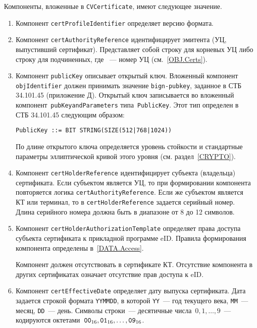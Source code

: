 Компоненты, вложенные в \verb|CVCertificate|, имеют следующее значение.
\begin{enumerate}
\item
Компонент \verb|certProfileIdentifier| определяет версию формата. 

\item
Компонент \verb|certAuthorityReference| идентифицирует эмитента 
(УЦ, выпустивший сертификат). 
%
Представляет собой строку  для корневых УЦ либо  
строку  для подчиненных, где ~--- 
номер УЦ (см.~\ref{OBJ.Certs}).

\item
Компонент \verb|publicKey| описывает открытый ключ.
%
Вложенный компонент \verb|objIdentifier| 
должен принимать значение \texttt{bign-pubkey}, 
заданное в СТБ 34.101.45 (приложение Д).
%
Открытый ключ записывается во вложенный компонент~\verb|pubKeyandParameters| 
типа~\verb|PublicKey|. Этот тип определен в СТБ 34.101.45 следующим образом: 
\begin{verbatim} 
PublicKey ::= BIT STRING(SIZE(512|768|1024))
\end{verbatim} 

По длине открытого ключа определяется уровень стойкости и стандартные параметры  
эллиптической кривой этого уровня (см. раздел~\ref{CRYPTO}).

\item
Компонент \verb|certHolderReference| идентифицирует субъекта (владельца) 
сертификата. Если субъектом является УЦ, то при формировании компонента 
повторяется логика \verb|certAuthorityReference|. 
%
Если же субъектом является КТ или терминал, то в \verb|certHolderReference|
задается серийный номер. Длина серийного номера должна быть в диапазоне от 8 до 
12 символов. 

\item
Компонент \verb|certHolderAuthorizationTemplate| определяет права доступа 
субъекта сертификата к прикладной программе eID. Правила формирования 
компонента определены в~\ref{DATA.Access}.

Компонент должен отсутствовать в сертификате КТ.
%
Отсутствие компонента в других сертификатах означает отсутствие прав 
доступа к eID. 

\item
Компонент \verb|certEffectiveDate| определяет дату выпуска сертификата.
%
Дата задается строкой формата \texttt{YYMMDD}, 
в которой \texttt{YY}~--- год текущего века, 
\texttt{MM}~--- месяц, \texttt{DD}~--- день.
%
Символы строки~--- десятичные числа~$0,1,\ldots,9$~---
кодируются октетами~$\texttt{00}_{16},\texttt{01}_{16},\ldots,\texttt{09}_{16}$.


\end{enumerate}
